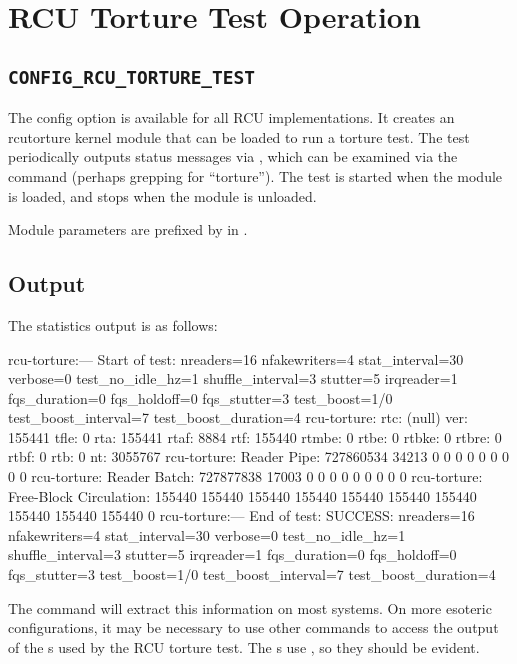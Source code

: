 
\section{RCU Torture Test Operation}
\label{sec:rcu:RCU Torture Test Operation}


\subsection{\texttt{CONFIG\_RCU\_TORTURE\_TEST}}

The  config option is available for all RCU
implementations.
It creates an rcutorture kernel module that can
be loaded to run a torture test.
The test periodically outputs
status messages via , which can be examined via the 
command (perhaps grepping for ``torture'').
The test is started
when the module is loaded, and stops when the module is unloaded.

Module parameters are prefixed by  in
.

\subsection{Output}

The statistics output is as follows:

\begin{VerbatimU}[breaklines=true]
	rcu-torture:--- Start of test: nreaders=16 nfakewriters=4 stat_interval=30 verbose=0 test_no_idle_hz=1 shuffle_interval=3 stutter=5 irqreader=1 fqs_duration=0 fqs_holdoff=0 fqs_stutter=3 test_boost=1/0 test_boost_interval=7 test_boost_duration=4
	rcu-torture: rtc:           (null) ver: 155441 tfle: 0 rta: 155441 rtaf: 8884 rtf: 155440 rtmbe: 0 rtbe: 0 rtbke: 0 rtbre: 0 rtbf: 0 rtb: 0 nt: 3055767
	rcu-torture: Reader Pipe:  727860534 34213 0 0 0 0 0 0 0 0 0
	rcu-torture: Reader Batch:  727877838 17003 0 0 0 0 0 0 0 0 0
	rcu-torture: Free-Block Circulation:  155440 155440 155440 155440 155440 155440 155440 155440 155440 155440 0
	rcu-torture:--- End of test: SUCCESS: nreaders=16 nfakewriters=4 stat_interval=30 verbose=0 test_no_idle_hz=1 shuffle_interval=3 stutter=5 irqreader=1 fqs_duration=0 fqs_holdoff=0 fqs_stutter=3 test_boost=1/0 test_boost_interval=7 test_boost_duration=4
\end{VerbatimU}

The command  will extract this information on
most systems.
On more esoteric configurations, it may be necessary to
use other commands to access the output of the s used by
the RCU torture test.
The s use , so they should
be evident.
\Winkey %

